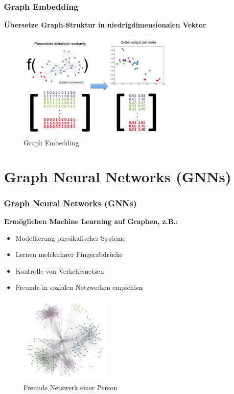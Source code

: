 \documentclass{beamer}
\begin{document}
\begin{frame}
  \frametitle{Graph Embedding}
  \textbf{Übersetze Graph-Struktur in niedrigdimensionalen Vektor}
  \begin{figure}
    \centering
    \includegraphics[width=0.7\textwidth]{img/graph_embedding.png}
    \caption*{Graph Embedding \cite{Frame2021}}
  \end{figure}
\end{frame}

\section{Graph Neural Networks (GNNs)}

\begin{frame}
  \frametitle{Graph Neural Networks (GNNs)}
  \textbf{Ermöglichen Machine Learning auf Graphen, z.B.:}
  \begin{itemize}
    \item Modellierung physikalischer Systeme
    \item Lernen molekularer Fingerabdrücke
    \item Kontrolle von Verkehrsnetzen
    \item Freunde in sozialen Netzwerken empfehlen
  \end{itemize}
  \begin{figure}
    \centering
    \includegraphics[width=0.4\textwidth]{img/social_graph.png}
    \caption*{Freunde Netzwerk einer Person \cite{Facebook}}
  \end{figure}
\end{frame}
\end{document}
